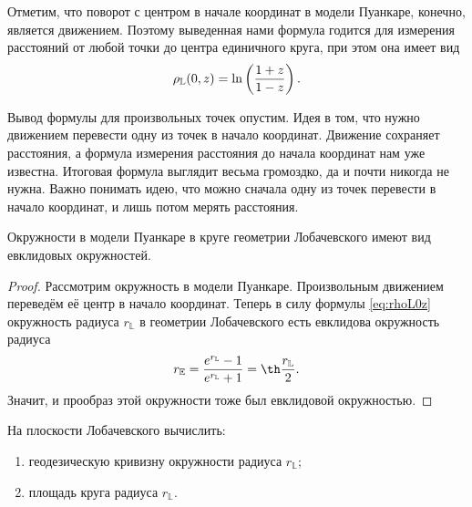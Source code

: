 Отметим, что поворот с центром в начале координат в модели Пуанкаре, конечно, является движением. Поэтому выведенная нами формула годится для измерения расстояний от любой точки до центра единичного круга, при этом она имеет вид
\begin{equation} \label{eq:rhoL0z}
	\rho_{\mathbb{L}}(0, z) = \ln\left(\frac{1 + z}{1 - z}\right).
\end{equation}

Вывод формулы для произвольных точек опустим. Идея в том, что нужно движением перевести одну из точек в начало координат. Движение сохраняет расстояния, а формула измерения расстояния до начала координат нам уже известна. Итоговая формула выглядит весьма громоздко, да и почти никогда не нужна. Важно понимать идею, что можно сначала одну из точек перевести в начало координат, и лишь потом мерять расстояния.

\begin{proposition}
	Окружности в модели Пуанкаре в круге геометрии Лобачевского имеют вид евклидовых окружностей.
\end{proposition}

\begin{proof}
	Рассмотрим окружность в модели Пуанкаре. Произвольным движением переведём её центр в начало координат. Теперь в силу формулы \eqref{eq:rhoL0z} окружность радиуса $r_{\mathbb{L}}$ в геометрии Лобачевского есть евклидова окружность радиуса
	\begin{equation} \label{eq:LtoE}
		r_{\mathbb{E}} = \frac{e^{r_{\mathbb{L}}} - 1}{e^{r_{\mathbb{L}}} + 1} = \th\frac{r_{\mathbb{L}}}{2}.
	\end{equation}
	Значит, и прообраз этой окружности тоже был евклидовой окружностью.
\end{proof}

\begin{problem}
	На плоскости Лобачевского вычислить:
	\begin{enumerate}[nolistsep, label=(\arabic*)]
		\item геодезическую кривизну окружности радиуса $r_{\mathbb{L}}$;
		\item площадь круга радиуса $r_{\mathbb{L}}$.
	\end{enumerate}
\end{problem}

